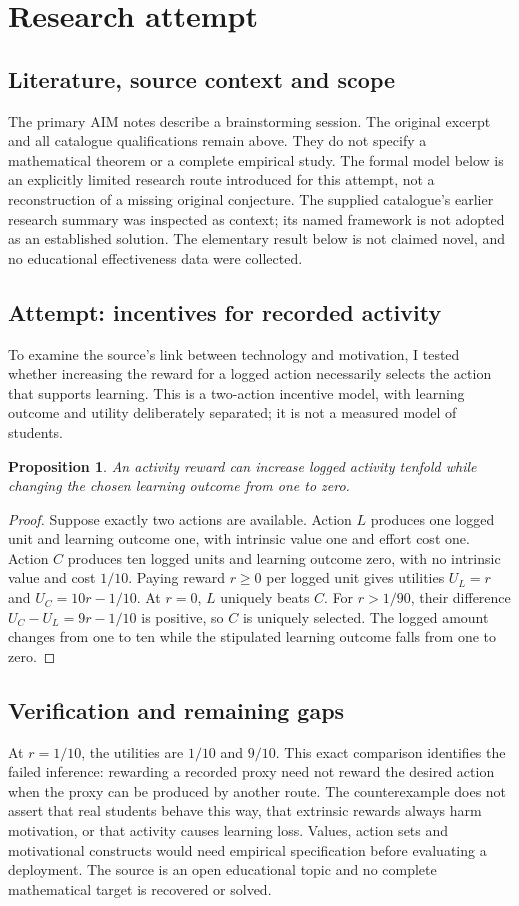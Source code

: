 \documentclass[11pt]{article}
\newtheorem{proposition}{Proposition}
\begin{document}
\section{Research attempt}
\subsection{Literature, source context and scope}
The primary AIM notes describe a brainstorming session. The original excerpt and all catalogue qualifications remain above. They do not specify a mathematical theorem or a complete empirical study. The formal model below is an explicitly limited research route introduced for this attempt, not a reconstruction of a missing original conjecture. The supplied catalogue's earlier research summary was inspected as context; its named framework is not adopted as an established solution. The elementary result below is not claimed novel, and no educational effectiveness data were collected.

\subsection{Attempt: incentives for recorded activity}
To examine the source's link between technology and motivation, I tested whether increasing the reward for a logged action necessarily selects the action that supports learning. This is a two-action incentive model, with learning outcome and utility deliberately separated; it is not a measured model of students.
\begin{proposition}
An activity reward can increase logged activity tenfold while changing the chosen learning outcome from one to zero.
\end{proposition}
\begin{proof}
Suppose exactly two actions are available. Action $L$ produces one logged unit and learning outcome one, with intrinsic value one and effort cost one. Action $C$ produces ten logged units and learning outcome zero, with no intrinsic value and cost $1/10$. Paying reward $r\ge0$ per logged unit gives utilities $U_L=r$ and $U_C=10r-1/10$. At $r=0$, $L$ uniquely beats $C$. For $r>1/90$, their difference $U_C-U_L=9r-1/10$ is positive, so $C$ is uniquely selected. The logged amount changes from one to ten while the stipulated learning outcome falls from one to zero.
\end{proof}
\subsection{Verification and remaining gaps}
At $r=1/10$, the utilities are $1/10$ and $9/10$. This exact comparison identifies the failed inference: rewarding a recorded proxy need not reward the desired action when the proxy can be produced by another route. The counterexample does not assert that real students behave this way, that extrinsic rewards always harm motivation, or that activity causes learning loss. Values, action sets and motivational constructs would need empirical specification before evaluating a deployment. The source is an open educational topic and no complete mathematical target is recovered or solved.
\end{document}
